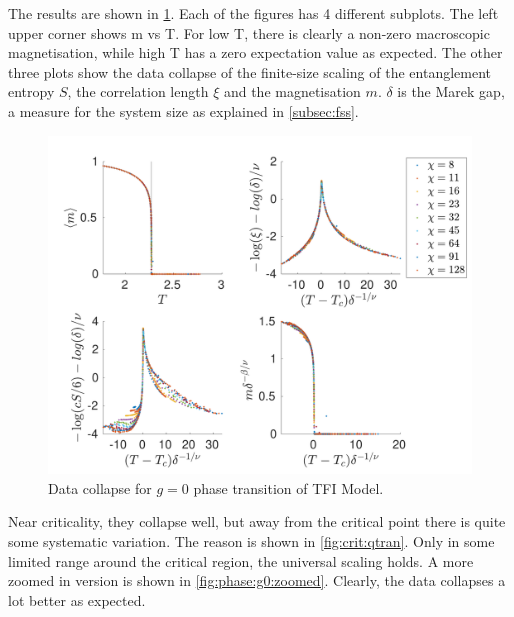 The results are shown in \cref{fig:phase:g0:full}. Each of the figures has 4 different subplots. The left upper corner shows m vs T. For low T, there is clearly a non-zero macroscopic magnetisation, while high T has a zero expectation value as expected. The other three plots show the data collapse of the finite-size scaling of the entanglement entropy $S$, the correlation length $\xi$ and the magnetisation $m$. $\delta$ is the Marek gap, a measure for the system size as explained in \cref{subsec:fss}.
\begin{figure}[h!]
    \center
    \includegraphics[width=\textwidth]{Figuren/phasediag/g0/Full.pdf}
    \caption{ Data collapse for $g=0$ phase transition of \Gls{TFI} Model. }
    \label{fig:phase:g0:full}
\end{figure}
Near criticality, they collapse well, but away from the critical point there is quite some systematic variation. The reason is shown in \cref{fig:crit:qtran}. Only in some limited range around the critical region, the universal scaling holds. A more zoomed in version is shown in \cref{fig:phase:g0:zoomed}. Clearly, the data collapses a lot better as expected.
